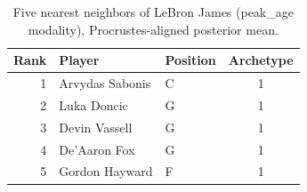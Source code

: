 \begin{table}[htbp]
  \centering\small
  \begin{tabular}{rllc}
    \toprule
    Rank & Player & Position & Archetype \\
    \midrule
    1 & Arvydas Sabonis & C & 1 \\
    2 & Luka Doncic & G & 1 \\
    3 & Devin Vassell & G & 1 \\
    4 & De'Aaron Fox & G & 1 \\
    5 & Gordon Hayward & F & 1 \\
    \bottomrule
  \end{tabular}
  \caption{Five nearest neighbors of LeBron James (peak_age modality), Procrustes-aligned posterior mean.}
  \label{tab:LeBron_James_neighbors_peak_age}
\end{table}

